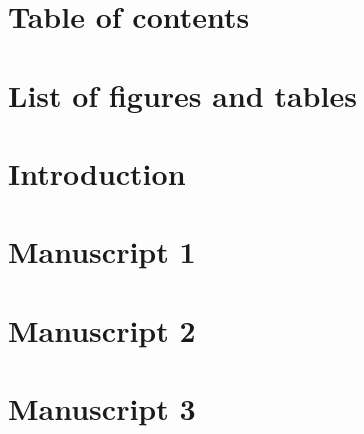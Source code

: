 \documentclass[12pt,a4paper]{report}
\begin{document}
\chapter*{Table of contents}
\tableofcontents
{}





\clearpage
\chapter*{List of figures and tables}
\listoffigures
\listoftables






\cleardoublepage
{} %


\chapter{Introduction}

\lipsum[1]

\citet{famaCrossSectionExpectedStock1992}



\chapter{Manuscript 1}\label{chapter1}

\lipsum[1]



\chapter{Manuscript 2}\label{chapter2}

\lipsum[1]



\chapter{Manuscript 3}\label{chapter3}

\lipsum[1]




\clearpage
\renewcommand{\appendixname}{Appendix~\Alph{section}}
\renewcommand{\thefigure}{\thechapter{}\arabic{figure}}
\renewcommand{\thetable}{\thechapter{}\arabic{table}}
\appendix
\end{document}
